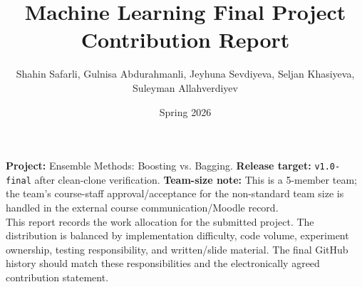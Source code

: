 \documentclass[10pt,a4paper,landscape]{article}
\title{Machine Learning Final Project\\Contribution Report}
\author{Shahin Safarli, Gulnisa Abdurahmanli, Jeyhuna Sevdiyeva, Seljan Khasiyeva, Suleyman Allahverdiyev}
\date{Spring 2026}
\begin{document}
\maketitle

\noindent
\textbf{Project:} Ensemble Methods: Boosting vs. Bagging.\quad
\textbf{Release target:} \texttt{v1.0-final} after clean-clone verification.\quad
\textbf{Team-size note:} This is a 5-member team; the team's course-staff approval/acceptance for the non-standard team size is handled in the external course communication/Moodle record.\\[0.35em]
This report records the work allocation for the submitted project. The distribution is balanced by implementation difficulty, code volume, experiment ownership, testing responsibility, and written/slide material. The final GitHub history should match these responsibilities and the electronically agreed contribution statement.
\end{document}
